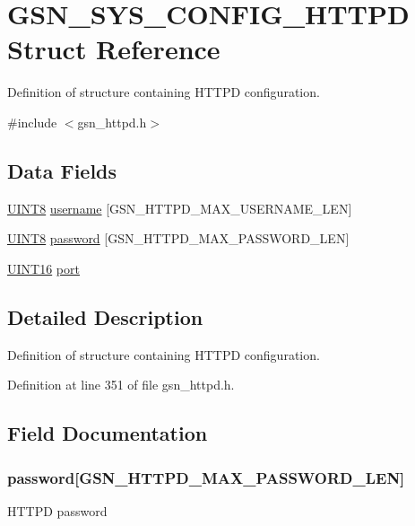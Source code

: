 \hypertarget{a00246}{
\section{GSN\_\-SYS\_\-CONFIG\_\-HTTPD Struct Reference}
\label{a00246}
}


Definition of structure containing HTTPD configuration.  




{\ttfamily \#include $<$gsn\_\-httpd.h$>$}

\subsection*{Data Fields}
\begin{DoxyCompactItemize}
\item 
\hyperlink{a00660_gab27e9918b538ce9d8ca692479b375b6a}{UINT8} \hyperlink{a00246_a387509f70bf5ba8b2f0d1435e44d4b05}{username} \mbox{[}GSN\_\-HTTPD\_\-MAX\_\-USERNAME\_\-LEN\mbox{]}
\item 
\hyperlink{a00660_gab27e9918b538ce9d8ca692479b375b6a}{UINT8} \hyperlink{a00246_ad3e2427a8fe975635cb6d6fc0206ff46}{password} \mbox{[}GSN\_\-HTTPD\_\-MAX\_\-PASSWORD\_\-LEN\mbox{]}
\item 
\hyperlink{a00660_ga09f1a1fb2293e33483cc8d44aefb1eb1}{UINT16} \hyperlink{a00246_a126a61701dc53e71d74b8e1b50c01ce3}{port}
\end{DoxyCompactItemize}


\subsection{Detailed Description}
Definition of structure containing HTTPD configuration. 

Definition at line 351 of file gsn\_\-httpd.h.



\subsection{Field Documentation}
\hypertarget{a00246_ad3e2427a8fe975635cb6d6fc0206ff46}{
\subsubsection[{password}]{ {\bf password}\mbox{[}GSN\_\-HTTPD\_\-MAX\_\-PASSWORD\_\-LEN\mbox{]}}}
\label{a00246_ad3e2427a8fe975635cb6d6fc0206ff46}
HTTPD password 

